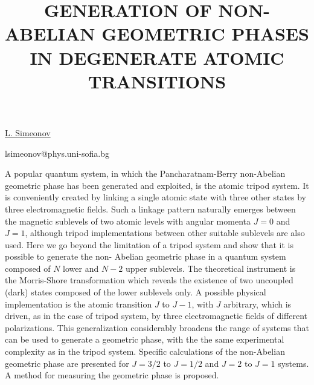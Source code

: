 \title{GENERATION OF NON-ABELIAN GEOMETRIC PHASES IN DEGENERATE ATOMIC TRANSITIONS}

\underline{L. Simeonov} 

{\normalsize{\vspace{-4mm}
\unisofia

\email lsimeonov@phys.uni-sofia.bg}}

A popular quantum system, in which the Pancharatnam-Berry non-Abelian geometric phase has
been generated and exploited, is the atomic tripod system. It is conveniently created by linking a
single atomic state with three other states by three electromagnetic fields. Such a linkage pattern
naturally emerges between the magnetic sublevels of two atomic levels with angular momenta $J = 0$
and $J = 1$, although tripod implementations between other suitable sublevels are also used. Here
we go beyond the limitation of a tripod system and show that it is possible to generate the non-
Abelian geometric phase in a quantum system composed of $N$ lower and $N-2$ upper sublevels.
The theoretical instrument is the Morris-Shore transformation which reveals the existence of two
uncoupled (dark) states composed of the lower sublevels only. A possible physical implementation
is the atomic transition $J$ to $J-1$, with $J$ arbitrary, which is driven, as in the case of tripod system,
by three electromagnetic fields of different polarizations. This generalization considerably broadens the range of systems that can be used to generate a geometric phase, with the the same experimental complexity as in the tripod system. Specific calculations of the non-Abelian geometric phase are presented for $J = 3/2$ to $J=1/2$ and $J=2$ to $J =1$ systems.  A method for measuring the geometric
phase is proposed.

\vspace{\baselineskip} 